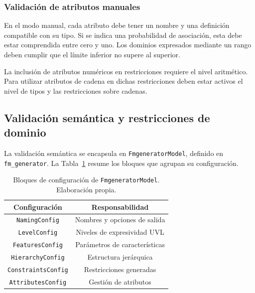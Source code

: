 \subsubsection*{Validación de atributos manuales}

En el modo manual, cada atributo debe tener un nombre y una definición
compatible con su tipo. Si se indica una probabilidad de asociación, esta
debe estar comprendida entre cero y uno. Los dominios expresados mediante
un rango deben cumplir que el límite inferior no supere al superior.

La inclusión de atributos numéricos en restricciones requiere el nivel
aritmético. Para utilizar atributos de cadena en dichas restricciones deben
estar activos el nivel de tipos y las restricciones sobre cadenas.

\subsection{Validación semántica y restricciones de dominio}
\label{subsec:validacion_semantica}

La validación semántica se encapsula en \texttt{FmgeneratorModel}, definido
en \texttt{fm\_generator}. La Tabla~\ref{tab:generator_configs} resume los
bloques que agrupan su configuración.

\begin{table}[H]
    \centering
    \begin{tabular}{|c|c|}
        \hline
        \textbf{Configuración} & \textbf{Responsabilidad} \\
        \hline
        \texttt{NamingConfig} & Nombres y opciones de salida \\
        \hline
        \texttt{LevelConfig} & Niveles de expresividad UVL \\
        \hline
        \texttt{FeaturesConfig} & Parámetros de características \\
        \hline
        \texttt{HierarchyConfig} & Estructura jerárquica \\
        \hline
        \texttt{ConstraintsConfig} & Restricciones generadas \\
        \hline
        \texttt{AttributesConfig} & Gestión de atributos \\
        \hline
    \end{tabular}
    \caption{Bloques de configuración de \texttt{FmgeneratorModel}. Elaboración propia.}
    \label{tab:generator_configs}
\end{table}

